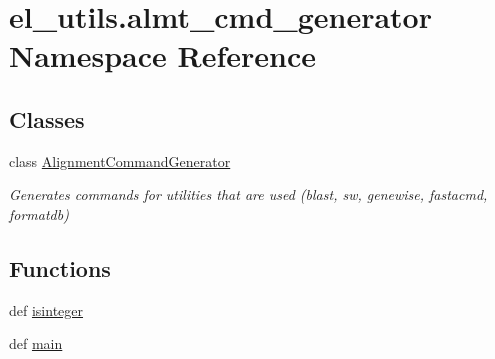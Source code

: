 \hypertarget{namespaceel__utils_1_1almt__cmd__generator}{\section{el\-\_\-utils.\-almt\-\_\-cmd\-\_\-generator Namespace Reference}
\label{namespaceel__utils_1_1almt__cmd__generator}
}
\subsection*{Classes}
\begin{DoxyCompactItemize}
\item 
class \hyperlink{classel__utils_1_1almt__cmd__generator_1_1AlignmentCommandGenerator}{Alignment\-Command\-Generator}
\begin{DoxyCompactList}\small\item\em Generates commands for utilities that are used (blast, sw, genewise, fastacmd, formatdb) \end{DoxyCompactList}\end{DoxyCompactItemize}
\subsection*{Functions}
\begin{DoxyCompactItemize}
\item 
def \hyperlink{namespaceel__utils_1_1almt__cmd__generator_af6d9842f74f4725c74f59f5405a40f3d}{isinteger}
\item 
def \hyperlink{namespaceel__utils_1_1almt__cmd__generator_a618d7338a62ac0815c28e27ac7a6c703}{main}
\end{DoxyCompactItemize}


